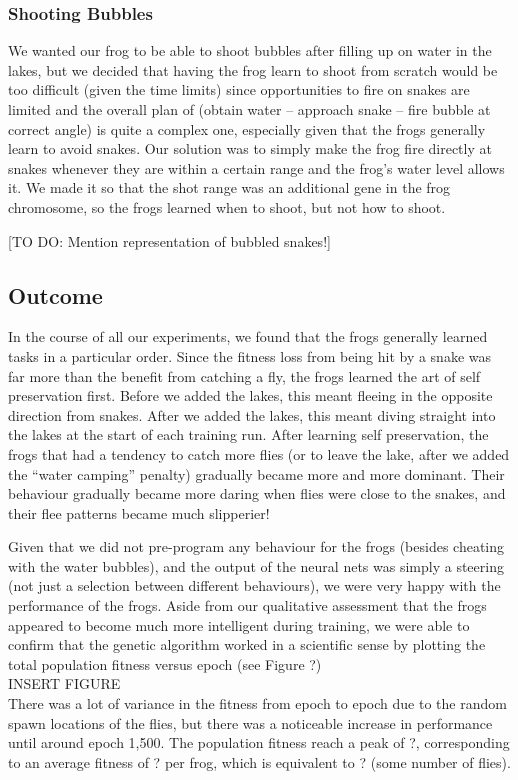 \subsubsection{Shooting Bubbles}
We wanted our frog to be able to shoot bubbles after filling up on water in the lakes, but we decided that having the frog learn to shoot from scratch would be too difficult (given the time limits) since opportunities to fire on snakes are limited and the overall plan of (obtain water -- approach snake -- fire bubble at correct angle) is quite a complex one, especially given that the frogs generally learn to avoid snakes. Our solution was to simply make the frog fire directly at snakes whenever they are within a certain range and the frog's water level allows it. We made it so that the shot range was an additional gene in the frog chromosome, so the frogs learned when to shoot, but not how to shoot.

[TO DO: Mention representation of bubbled snakes!]

\subsection{Outcome}
In the course of all our experiments, we found that the frogs generally learned tasks in a particular order. Since the fitness loss from being hit by a snake was far more than the benefit from catching a fly, the frogs learned the art of self preservation first. Before we added the lakes, this meant fleeing in the opposite direction from snakes. After we added the lakes, this meant diving straight into the lakes at the start of each training run. After learning self preservation, the frogs that had a tendency to catch more flies (or to leave the lake, after we added the ``water camping'' penalty) gradually became more and more dominant. Their behaviour gradually became more daring when flies were close to the snakes, and their flee patterns became much slipperier!

Given that we did not pre-program any behaviour for the frogs (besides cheating with the water bubbles), and the output of the neural nets was simply a steering (not just a selection between different behaviours), we were very happy with the performance of the frogs. Aside from our qualitative assessment that the frogs appeared to become much more intelligent during training, we were able to confirm that the genetic algorithm worked in a scientific sense by plotting the total population fitness versus epoch (see Figure ?)\\

INSERT FIGURE\\

There was a lot of variance in the fitness from epoch to epoch due to the random spawn locations of the flies, but there was a noticeable increase in performance until around epoch 1,500. The population fitness reach a peak of ?, corresponding to an average fitness of ? per frog, which is equivalent to ? (some number of flies).